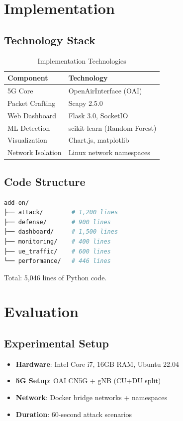 \documentclass[conference]{IEEEtran}
\begin{document}
\section{Implementation}

\subsection{Technology Stack}

\begin{table}[h]
\centering
\caption{Implementation Technologies}
\begin{tabular}{ll}
\toprule
\textbf{Component} & \textbf{Technology} \\
\midrule
5G Core & OpenAirInterface (OAI) \\
Packet Crafting & Scapy 2.5.0 \\
Web Dashboard & Flask 3.0, SocketIO \\
ML Detection & scikit-learn (Random Forest) \\
Visualization & Chart.js, matplotlib \\
Network Isolation & Linux network namespaces \\
\bottomrule
\end{tabular}
\end{table}

\subsection{Code Structure}

\begin{lstlisting}[language=bash, basicstyle=\small\ttfamily]
add-on/
├── attack/        # 1,200 lines
├── defense/       # 900 lines
├── dashboard/     # 1,500 lines
├── monitoring/    # 400 lines
├── ue_traffic/    # 600 lines
└── performance/   # 446 lines
\end{lstlisting}

Total: 5,046 lines of Python code.

\section{Evaluation}

\subsection{Experimental Setup}

\begin{itemize}
    \item \textbf{Hardware}: Intel Core i7, 16GB RAM, Ubuntu 22.04
    \item \textbf{5G Setup}: OAI CN5G + gNB (CU+DU split)
    \item \textbf{Network}: Docker bridge networks + namespaces
    \item \textbf{Duration}: 60-second attack scenarios
\end{itemize}
\end{document}
